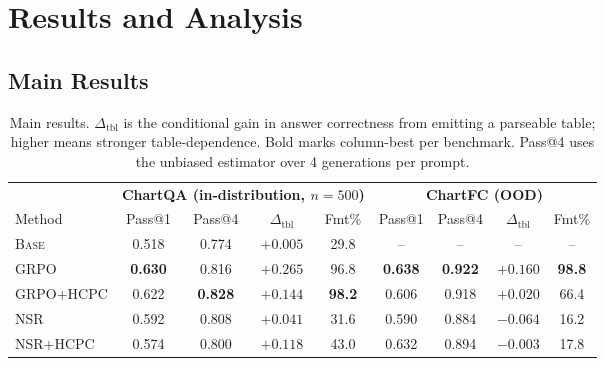 \documentclass[11pt]{article}
\begin{document}
\section{Results and Analysis}
\label{sec:results}

\subsection{Main Results}
\label{sec:main_results}

\begin{table}[t]
\centering
\small
\setlength{\tabcolsep}{5pt}
\begin{tabular}{lcccc|cccc}
\toprule
& \multicolumn{4}{c}{\textbf{ChartQA (in-distribution, $n{=}500$)}}
& \multicolumn{4}{c}{\textbf{ChartFC (OOD)}}\\
\cmidrule(lr){2-5}\cmidrule(lr){6-9}
Method & Pass@1 & Pass@4 & $\Delta_{\text{tbl}}$ & Fmt\% &
Pass@1 & Pass@4 & $\Delta_{\text{tbl}}$ & Fmt\%\\
\midrule
\textsc{Base}      & 0.518 & 0.774 & $+0.005$ & 29.8 & --    & --    & --       & --\\
\textsc{GRPO}      & \textbf{0.630} & 0.816 & $\mathbf{+0.265}$ & 96.8 & \textbf{0.638} & \textbf{0.922} & $\mathbf{+0.160}$ & \textbf{98.8}\\
\textsc{GRPO+HCPC} & 0.622 & \textbf{0.828} & $+0.144$ & \textbf{98.2} & 0.606 & 0.918 & $+0.020$ & 66.4\\
\textsc{NSR}       & 0.592 & 0.808 & $+0.041$ & 31.6 & 0.590 & 0.884 & $-0.064$ & 16.2\\
\textsc{NSR+HCPC}  & 0.574 & 0.800 & $+0.118$ & 43.0 & 0.632 & 0.894 & $-0.003$ & 17.8\\
\bottomrule
\end{tabular}
\caption{Main results. $\Delta_{\text{tbl}}$ is the conditional gain
in answer correctness from emitting a parseable table; higher means
stronger table-dependence. Bold marks column-best per benchmark.
Pass@4 uses the unbiased estimator over 4 generations per prompt.}
\label{tab:main}
\end{table}
\end{document}
